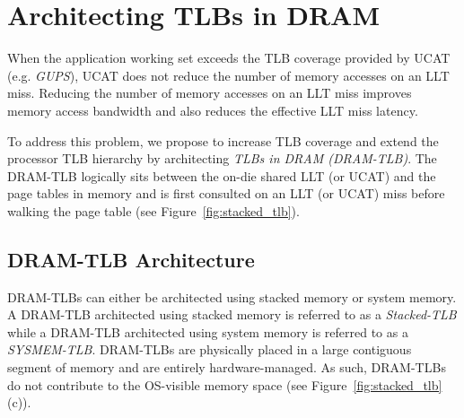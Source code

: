 \section{Architecting TLBs in DRAM } 
\label{sec:stackedTLB}

\noindent When the application working set exceeds the TLB coverage
provided by UCAT (e.g. {\em GUPS}), UCAT does not reduce the number of
memory accesses on an LLT miss. Reducing the number of memory accesses
on an LLT miss improves memory access bandwidth and also reduces the
effective LLT miss latency.

To address this problem, we propose to increase TLB coverage and
extend the processor TLB hierarchy by architecting {\em TLBs in DRAM
(DRAM-TLB)}. The DRAM-TLB logically sits between the on-die shared LLT
(or UCAT) and the page tables in memory and is first consulted on an
LLT (or UCAT) miss before walking the page table (see
Figure~\ref{fig:stacked_tlb}).


\begin{figure*}[t] 
  \vspace{-0. in} \centering
   \centerline{}

  \caption{\small Improving TLB coverage by embedding TLBs in DRAM
    (DRAM-TLB). A DRAM-TLB architected using commodity DRAM is called
    SYSMEM-TLB and a DRAM-TLB architected with stacked DRAM is called
    Stacked-TLB. \normalsize}
  \label{fig:stacked_tlb} 
  \vspace{-0. in}
\end{figure*}

\subsection{DRAM-TLB Architecture}

\noindent DRAM-TLBs can either be architected using stacked memory or
system memory. A DRAM-TLB architected using stacked memory is referred
to as a {\em Stacked-TLB} while a DRAM-TLB architected using system
memory is referred to as a {\em SYSMEM-TLB}. DRAM-TLBs are physically
placed in a large contiguous segment of memory and are entirely
hardware-managed. As such, DRAM-TLBs do not contribute to the
OS-visible memory space (see Figure~\ref{fig:stacked_tlb}(c)).

